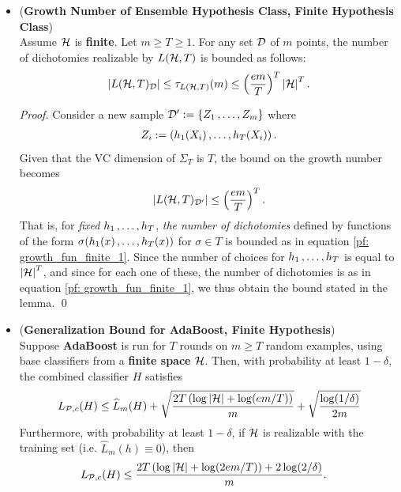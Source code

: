 \documentclass[11pt]{article}
\begin{document}
\begin{itemize}
\item \begin{lemma} (\textbf{Growth Number of Ensemble Hypothesis Class, Finite Hypothesis Class}) \citep{schapire2012boosting, shalev2014understanding} \\
Assume ${\mathcal H}$ is \textbf{finite}. Let $m \ge T \ge 1$. For any set ${\mathcal D}$ of $m$ points, the number of dichotomies realizable by $L({\mathcal H}, T)$ is bounded as follows:
\begin{align}
\left\lvert L({\mathcal H}, T)_{{\mathcal D}} \right\rvert \le \tau_{L({\mathcal H}, T)}(m) \le \left(\frac{em}{T}\right)^T \left\lvert {\mathcal H} \right\rvert^T.  \label{ineqn: growth_fun_ensemble_finite}
\end{align}
\end{lemma}
\begin{proof}
Consider a new sample ${\mathcal D}' := \left\{Z_1 \,{,}\ldots{,}\, Z_m\right\}$ where
\begin{align*}
Z_i := \left(h_1(X_i) \,{,}\ldots{,}\, h_T(X_i)\right).
\end{align*} Given that the VC dimension of $\Sigma_T$ is $T$, the bound on the growth number becomes
\begin{align}
\left\lvert L({\mathcal H}, T)_{{\mathcal D}'} \right\rvert \le \left(\frac{em}{T}\right)^T. \label{pf: growth_fun_finite_1}
\end{align} That is, for \emph{fixed} $h_1 \,{,}\ldots{,}\, h_T$, \emph{the number of dichotomies} defined by functions of the form $\sigma(h_1(x) \,{,}\ldots{,}\, h_T(x))$ for $\sigma \in T$ is bounded as in equation \eqref{pf: growth_fun_finite_1}. Since the number of choices for $h_1 \,{,}\ldots{,}\, h_T$ is equal to $\left\lvert {\mathcal H} \right\rvert^T$, and since for each one of these, the number of dichotomies is as in equation \eqref{pf: growth_fun_finite_1}, we thus obtain the bound stated in the lemma. \qed
\end{proof}

\item \begin{theorem}  (\textbf{Generalization Bound for AdaBoost, Finite Hypothesis}) \citep{schapire2012boosting}\\
Suppose \textbf{AdaBoost} is run for $T$ rounds on $m \ge T$ random examples, using base classifiers from a \textbf{finite space} ${\mathcal H}$. Then, with probability at least $1 - \delta$, the combined classifier $H$ satisfies
\begin{align}
L_{{\mathcal P}, c}(H) \le \widehat{L}_{m}(H) + \sqrt{\frac{2 T\left( \log \left\lvert {\mathcal H} \right\rvert + \log(em/T) \right)}{m}} +\sqrt{\frac{\log(1/\delta)}{2m}} \label{eqn: generalization_bound_growth_number_adaboost_finite}
\end{align} Furthermore, with probability at least $1 - \delta$, if ${\mathcal H}$ is realizable with the training set (i.e. $\widehat{L}_{m}(h) \equiv 0$), then
\begin{align}
L_{{\mathcal P}, c}(H) &\le \frac{2 T\left( \log \left\lvert {\mathcal H} \right\rvert + \log(2em/T) \right) + 2\log(2/\delta)}{m}. \label{eqn: pac_sample_complexity_finite_case_consistency}
\end{align}
\end{theorem}
\end{itemize}
\end{document}
